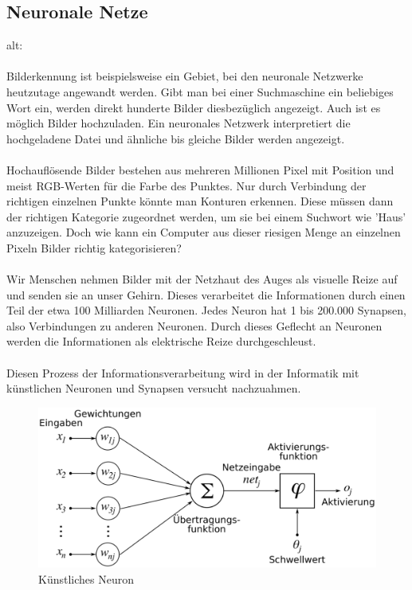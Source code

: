 \documentclass[12pt,oneside,a4paper,parskip]{scrbook}
\begin{document}
\subsection{Neuronale Netze}
alt:
\\\\
Bilderkennung ist beispielsweise ein Gebiet, bei den neuronale Netzwerke heutzutage angewandt werden. Gibt man bei einer Suchmaschine ein beliebiges Wort ein, werden direkt hunderte Bilder diesbezüglich angezeigt. Auch ist es möglich Bilder hochzuladen. Ein neuronales Netzwerk interpretiert die hochgeladene Datei und ähnliche bis gleiche Bilder werden angezeigt. 
\\\\
Hochauflösende Bilder bestehen aus mehreren Millionen Pixel mit Position und meist RGB-Werten für die Farbe des Punktes. 
Nur durch Verbindung der richtigen einzelnen Punkte könnte man Konturen erkennen. 
%
Diese müssen dann der richtigen Kategorie zugeordnet werden, um sie bei einem Suchwort wie 'Haus' anzuzeigen. Doch wie kann ein Computer aus dieser riesigen Menge an einzelnen Pixeln Bilder richtig kategorisieren?
\\\\
Wir Menschen nehmen Bilder mit der Netzhaut des Auges als visuelle Reize auf und senden sie an unser Gehirn. Dieses verarbeitet die Informationen durch einen Teil der etwa 100 Milliarden Neuronen. Jedes Neuron hat 1 bis 200.000 Synapsen, also Verbindungen zu anderen Neuronen. Durch dieses Geflecht an Neuronen werden die Informationen als elektrische Reize durchgeschleust. %
\\\\
Diesen Prozess der Informationsverarbeitung wird in der Informatik mit künstlichen Neuronen und Synapsen versucht nachzuahmen. 

\begin{figure}[ht]
	\begin{center}
		\includegraphics[width=12cm]{Bilder/ArtificialNeuronModel_deutsch.png}
		\caption{Künstliches Neuron}
		\label{fig:wikiNeuron}
	\end{center}
\end{figure}
\end{document}
